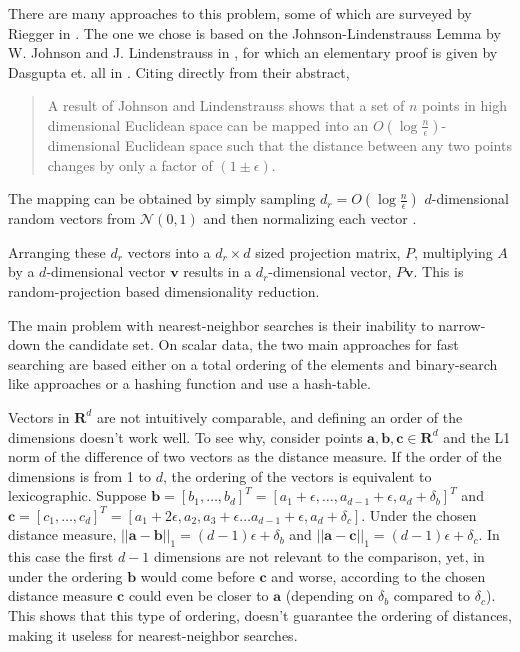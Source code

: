 \documentclass{article}
\begin{document}
There are many approaches to this problem, some of which are surveyed by Riegger
in \cite{Riegger2010}.
The one we chose is based on the Johnson-Lindenstrauss Lemma by W. Johnson and
J. Lindenstrauss in \cite{jl}, for which an
elementary proof is given by Dasgupta et. all in \cite{Dasgupta2003}. Citing
directly from their abstract,

\begin{quote}
    A result of Johnson and Lindenstrauss shows that a set of $n$ points in
    high dimensional Euclidean space can be mapped into an $O(\log
    \frac{n}{\epsilon})$-dimensional Euclidean space such that the distance
    between any two points changes by only a factor of $(1 \pm \epsilon)$.
\end{quote}

The mapping can be obtained by simply sampling $d_r = O(\log \frac{n}{\epsilon})$
$d$-dimensional random vectors from $\mathcal{N}(0, 1)$ and then
normalizing each vector \cite{Dasgupta2003}.

Arranging these $d_r$ vectors into a $d_r \times d$ sized
projection matrix, $P$, multiplying $A$ by a $d$-dimensional vector
$\mathbf{v}$ results in a $d_r$-dimensional vector, $P \mathbf{v}$.
This is random-projection based dimensionality reduction.

The main problem with nearest-neighbor searches is their inability to
narrow-down the candidate set. On scalar data, the two main approaches for
fast searching are based either on a total ordering of the elements and
binary-search like approaches or a hashing function and use a hash-table.

Vectors in $\mathbf{R}^d$ are not intuitively comparable, and defining an
order of the dimensions doesn't work well. To see why, consider points
$\mathbf{a, b, c} \in \mathbf{R}^d$ and the L1 norm of the difference of two
vectors as the distance measure. If the order of the dimensions is from 1
to $d$, the ordering of the vectors is equivalent to lexicographic. Suppose
$\mathbf{b} = [b_1, \ldots, b_d]^T = [a_1 + \epsilon, \ldots, a_{d - 1} + \epsilon, a_d + \delta_b]^T$ and $\mathbf{c} = [c_1, \ldots, c_d]^T = [a_1 + 2 \epsilon, a_2, a_3 + \epsilon \ldots a_{d - 1} + \epsilon, a_d + \delta_c]$.
Under the chosen distance measure, $||\mathbf{a} - \mathbf{b}||_1 = (d - 1)
\epsilon + \delta_b$ and $||\mathbf{a} - \mathbf{c}||_1 = (d - 1) \epsilon +
\delta_c$.
In this case the first $d-1$ dimensions are not relevant to the comparison,
yet, in under the ordering $\mathbf{b}$ would come before $\mathbf{c}$ and
worse, according to the chosen distance measure $\mathbf{c}$ could even be closer to
$\mathbf{a}$ (depending on $\delta_b$ compared to $\delta_c$).
This shows that this type of ordering, doesn't guarantee the ordering of
distances, making it useless for nearest-neighbor searches.
\end{document}

